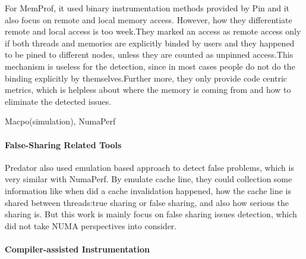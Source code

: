 For MemProf\cite{valat:2018:numaprof}, it used binary instrumentation methods provided by Pin and it also focus on remote and local memory access. However, how they differentiate remote and local access is too week.They marked an access as remote access only if both threads and memories are explicitly binded by users and they happened to be pined to different nodes, unless they are counted as unpinned access.This mechanism is useless for the detection, since in most cases people do not do the binding explicitly by themselves.Further more, they only provide code centric metrics, which is helpless about where the memory is coming from and how to eliminate the detected issues.

Macpo(simulation), 
NumaPerf


\paragraph{False-Sharing Related Tools} 
Predator\cite{Predator} also used emulation based approach to detect false problems, which is very similar with NumaPerf. By emulate cache line, they could collection some information like when did a cache invalidation happened, how the cache line is shared between threads:true sharing or false sharing, and also how serious the sharing is. But this work is mainly focus on false sharing issues detection, which did not take NUMA perspectives into consider.

\paragraph{Compiler-assisted Instrumentation}


